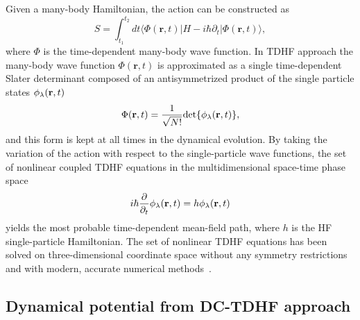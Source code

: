 \documentclass[aps,prc,twocolumn,showpacs,superscriptaddress,longbibliography,nofootinbib,floatfix,10pt]{revtex4-1}
\begin{document}
Given a many-body Hamiltonian, the action can be constructed as
\begin{equation}
S=\int_{t_1}^{t_2} dt \langle \Phi(\textbf{r}, t)|H-i\hbar \partial_t|\Phi(\textbf{r}, t)\rangle ,
\end{equation}
where $\Phi$ is the time-dependent many-body wave function.
In TDHF approach the many-body wave function $\Phi(\mathbf{r}, t)$ is approximated as a single time-dependent Slater determinant composed of an antisymmetrized product
of the single particle states $\phi_{\rm{\lambda}}(\mathbf{r}, t)$
\begin{equation}
\Phi(\mathbf{r}, t)=\frac{1}{\sqrt{N!}}\textrm{det}\{\phi_{\rm{\lambda}}(\mathbf{r}, t)\},
\end{equation}
and this form is kept at all times in the dynamical evolution.
By taking the variation of the action with respect to the single-particle wave functions, the set of nonlinear coupled TDHF equations in the multidimensional
space-time phase space
\begin{equation}
i\hbar \frac{\partial}{\partial_t}\phi_{\rm{\lambda}}(\mathbf{r}, t)=h\phi_{\rm{\lambda}}(\mathbf{r}, t)
\end{equation}
yields the most probable time-dependent mean-field path, where $h$ is the HF single-particle Hamiltonian.
The set of nonlinear TDHF equations has been solved on three-dimensional
coordinate space without any symmetry restrictions and with modern, accurate numerical methods~\cite{Umar2006_PRC73-054607,Maruhn2014_CPC185-2195}.

\subsection{Dynamical potential from DC-TDHF approach}
\end{document}
